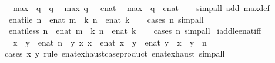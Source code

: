 \begin{isabellebody}
\ \ {\isachardoublequoteopen}max\ {}\ q\ {\isacharequal}\ q{\isachardoublequoteclose}\isanewline
\ \ {\isachardoublequoteopen}max\ q\ {\isasyminfinity}\ {\isacharequal}\ {\isacharparenleft}{\isasyminfinity}{\isacharcolon}{\isacharcolon}enat{\isacharparenright}{\isachardoublequoteclose}\isanewline
\ \ {\isachardoublequoteopen}max\ {\isasyminfinity}\ q\ {\isacharequal}\ {\isacharparenleft}{\isasyminfinity}{\isacharcolon}{\isacharcolon}enat{\isacharparenright}{\isachardoublequoteclose}\isanewline
%
\isadelimproof
\ \ %
\endisadelimproof
%
\isatagproof
{}\isamarkupfalse%
\ {\isacharparenleft}simp{\isacharunderscore}all\ add{\isacharcolon}\ max{\isacharunderscore}def{\isacharparenright}%
\endisatagproof
{\isafoldproof}%
%
\isadelimproof
\isanewline
%
\endisadelimproof
\isanewline
{}\isamarkupfalse%
\ enat{\isacharunderscore}ile{\isacharcolon}\ {\isachardoublequoteopen}n\ {\isasymle}\ enat\ m\ {\isasymLongrightarrow}\ {\isasymexists}k{\isachardot}\ n\ {\isacharequal}\ enat\ k{\isachardoublequoteclose}\isanewline
%
\isadelimproof
\ \ %
\endisadelimproof
%
\isatagproof
{}\isamarkupfalse%
\ {\isacharparenleft}cases\ n{\isacharparenright}\ simp{\isacharunderscore}all%
\endisatagproof
{\isafoldproof}%
%
\isadelimproof
\isanewline
%
\endisadelimproof
\isanewline
{}\isamarkupfalse%
\ enat{\isacharunderscore}iless{\isacharcolon}\ {\isachardoublequoteopen}n\ {\isacharless}\ enat\ m\ {\isasymLongrightarrow}\ {\isasymexists}k{\isachardot}\ n\ {\isacharequal}\ enat\ k{\isachardoublequoteclose}\isanewline
%
\isadelimproof
\ \ %
\endisadelimproof
%
\isatagproof
{}\isamarkupfalse%
\ {\isacharparenleft}cases\ n{\isacharparenright}\ simp{\isacharunderscore}all%
\endisatagproof
{\isafoldproof}%
%
\isadelimproof
\isanewline
%
\endisadelimproof
\isanewline
{}\isamarkupfalse%
\ iadd{\isacharunderscore}le{\isacharunderscore}enat{\isacharunderscore}iff{\isacharcolon}\isanewline
\ \ {\isachardoublequoteopen}x\ {\isacharplus}\ y\ {\isasymle}\ enat\ n\ {\isasymlongleftrightarrow}\ {\isacharparenleft}{\isasymexists}y{\isacharprime}\ x{\isacharprime}{\isachardot}\ x\ {\isacharequal}\ enat\ x{\isacharprime}\ {\isasymand}\ y\ {\isacharequal}\ enat\ y{\isacharprime}\ {\isasymand}\ x{\isacharprime}\ {\isacharplus}\ y{\isacharprime}\ {\isasymle}\ n{\isacharparenright}{\isachardoublequoteclose}\isanewline
%
\isadelimproof
%
\endisadelimproof
%
\isatagproof
{}\isamarkupfalse%
{\isacharparenleft}cases\ x\ y\ rule{\isacharcolon}\ enat{\isachardot}exhaust{\isacharbrackleft}case{\isacharunderscore}product\ enat{\isachardot}exhaust{\isacharbrackright}{\isacharparenright}\ simp{\isacharunderscore}all%

\end{isabellebody}
